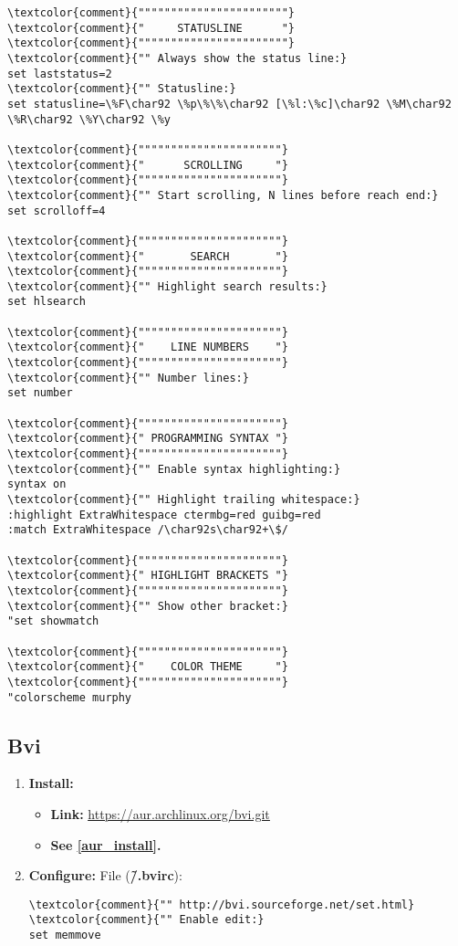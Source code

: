 \documentclass[10pt, a4paper, onecolumn, openany]{book} %
\begin{document}
\begin{enumerate}
\begin{Verbatim}[commandchars=\\\{\}]
\textcolor{comment}{"""""""""""""""""""""""}
\textcolor{comment}{"     STATUSLINE      "}
\textcolor{comment}{"""""""""""""""""""""""}
\textcolor{comment}{"" Always show the status line:}
set laststatus=2
\textcolor{comment}{"" Statusline:}
set statusline=\%F\char92 \%p\%\%\char92 [\%l:\%c]\char92 \%M\char92 \%R\char92 \%Y\char92 \%y

\textcolor{comment}{""""""""""""""""""""""}
\textcolor{comment}{"      SCROLLING     "}
\textcolor{comment}{""""""""""""""""""""""}
\textcolor{comment}{"" Start scrolling, N lines before reach end:}
set scrolloff=4

\textcolor{comment}{""""""""""""""""""""""}
\textcolor{comment}{"       SEARCH       "}
\textcolor{comment}{""""""""""""""""""""""}
\textcolor{comment}{"" Highlight search results:}
set hlsearch

\textcolor{comment}{""""""""""""""""""""""}
\textcolor{comment}{"    LINE NUMBERS    "}
\textcolor{comment}{""""""""""""""""""""""}
\textcolor{comment}{"" Number lines:}
set number

\textcolor{comment}{""""""""""""""""""""""}
\textcolor{comment}{" PROGRAMMING SYNTAX "}
\textcolor{comment}{""""""""""""""""""""""}
\textcolor{comment}{"" Enable syntax highlighting:}
syntax on
\textcolor{comment}{"" Highlight trailing whitespace:}
:highlight ExtraWhitespace ctermbg=red guibg=red
:match ExtraWhitespace /\char92s\char92+\$/

\textcolor{comment}{""""""""""""""""""""""}
\textcolor{comment}{" HIGHLIGHT BRACKETS "}
\textcolor{comment}{""""""""""""""""""""""}
\textcolor{comment}{"" Show other bracket:}
"set showmatch

\textcolor{comment}{""""""""""""""""""""""}
\textcolor{comment}{"    COLOR THEME     "}
\textcolor{comment}{""""""""""""""""""""""}
"colorscheme murphy
\end{Verbatim}
\subsection{Bvi}
\begin{enumerate}
    \item \textbf{Install:}
    \begin{itemize}
        \item \textbf{Link:} \underline{\href{https://aur.archlinux.org/bvi.git}{https://aur.archlinux.org/bvi.git}}
        \item \textbf{See \underline{\ref{aur_install}}.}
    \end{itemize}
    \item \textbf{Configure:}
\newline File (\textbf{\textcolor{file}{\~/.bvirc}}):
\begin{Verbatim}[commandchars=\\\{\}]
\textcolor{comment}{"" http://bvi.sourceforge.net/set.html}
\textcolor{comment}{"" Enable edit:}
set memmove


\end{Verbatim}
\end{enumerate}
\end{enumerate}
\end{document}
